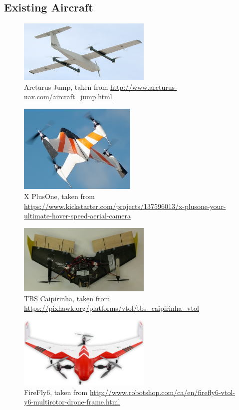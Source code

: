 \subsection*{Existing Aircraft}
\begin{figure}[!h]
	\centering
	\includegraphics[width=180pt]{Images/Aircraft/arcturus}
	\caption{Arcturus Jump, taken from \url{http://www.arcturus-uav.com/aircraft_jump.html}}
	\label{fig:arcturus}
\end{figure}

\begin{figure}[!h]
	\centering
	\includegraphics[width=160pt]{Images/Aircraft/xplusone}
	\caption[caption]{X PlusOne, taken from\\ \url{https://www.kickstarter.com/projects/137596013/x-plusone-your-ultimate-hover-speed-aerial-camera}}
	\label{fig:xplusone}
\end{figure}

\begin{figure}[!h]
	\centering
	\includegraphics[width=180pt]{Images/Aircraft/caipirinha}
	\caption{TBS Caipirinha, taken from \url{https://pixhawk.org/platforms/vtol/tbs_caipirinha_vtol}}
	\label{fig:caipirinha}
\end{figure}

\begin{figure}[!h]
	\centering
	\includegraphics[width=180pt]{Images/Aircraft/firefly6}
	\caption{FireFly6, taken from \url{http://www.robotshop.com/ca/en/firefly6-vtol-y6-multirotor-drone-frame.html}}
	\label{fig:firefly}
\end{figure}